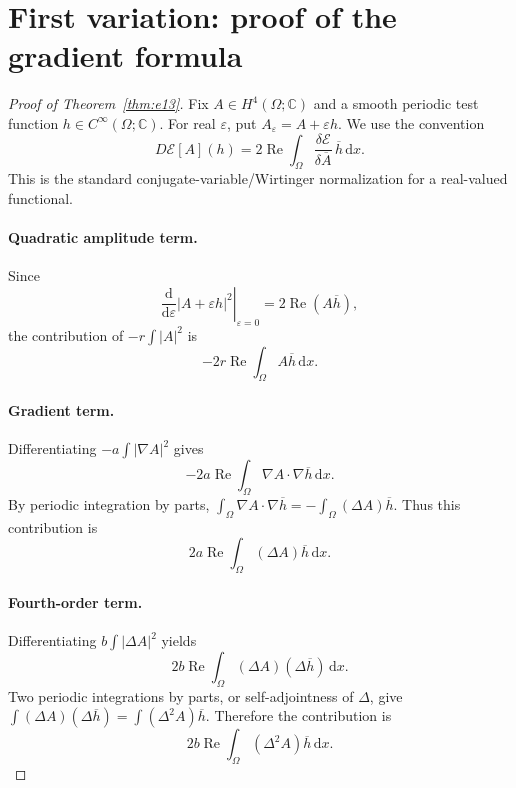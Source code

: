\documentclass[11pt]{article}
\newcommand{\Om}{\Omega}
\newcommand{\E}{\mathcal E}
\newcommand{\dd}{\mathrm d}
\newcommand{\Real}{\operatorname{Re}}
\begin{document}
\section{First variation: proof of the gradient formula}
\begin{proof}[Proof of Theorem~\ref{thm:e13}]
Fix $A\in H^4(\Om;\mathbb C)$ and a smooth periodic test function
$h\in C^\infty(\Om;\mathbb C)$. For real $\varepsilon$, put
$A_\varepsilon=A+\varepsilon h$. We use the convention
\begin{equation}\label{eq:variationconv}
 D\E[A](h)=2\Real\int_\Om
       \frac{\delta\E}{\delta\overline A}\,\overline h\,\dd x.
\end{equation}
This is the standard conjugate-variable/Wirtinger normalization for a
real-valued functional.

\paragraph{Quadratic amplitude term.}
Since
\[
 \left.\frac{\dd}{\dd\varepsilon}|A+\varepsilon h|^2
 \right|_{\varepsilon=0}=2\Real(A\overline h),
\]
the contribution of $-r\int|A|^2$ is
\begin{equation}\label{eq:var1}
 -2r\Real\int_\Om A\overline h\,\dd x.
\end{equation}

\paragraph{Gradient term.}
Differentiating $-a\int|\nabla A|^2$ gives
\[
 -2a\Real\int_\Om\nabla A\cdot\nabla\overline h\,\dd x.
\]
By periodic integration by parts,
$\int_\Om\nabla A\cdot\nabla\overline h
=-\int_\Om(\Delta A)\overline h$. Thus this contribution is
\begin{equation}\label{eq:var2}
 2a\Real\int_\Om(\Delta A)\overline h\,\dd x.
\end{equation}

\paragraph{Fourth-order term.}
Differentiating $b\int|\Delta A|^2$ yields
\[
 2b\Real\int_\Om(\Delta A)(\Delta\overline h)\,\dd x.
\]
Two periodic integrations by parts, or self-adjointness of $\Delta$,
give $\int(\Delta A)(\Delta\overline h)
=\int(\Delta^2 A)\overline h$. Therefore the contribution is
\begin{equation}\label{eq:var3}
 2b\Real\int_\Om(\Delta^2 A)\overline h\,\dd x.
\end{equation}


\end{proof}
\end{document}
